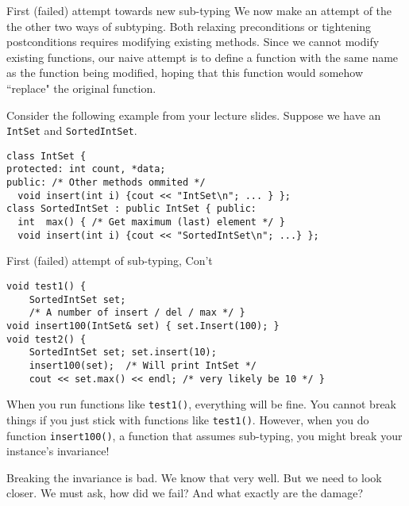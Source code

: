 \begin{frame}[fragile]{First (failed) attempt towards new sub-typing}
We now make an attempt of the the other two ways of subtyping. Both relaxing preconditions or tightening postconditions requires modifying existing methods. Since we cannot modify existing functions, our naive attempt is to define a function with the same name as the function being modified, hoping that this function would somehow ``replace" the original function. 

Consider the following example from your lecture slides. Suppose we have an \texttt{IntSet} and \texttt{SortedIntSet}.

\begin{verbatim}
class IntSet { 
protected: int count, *data; 
public: /* Other methods ommited */
  void insert(int i) {cout << "IntSet\n"; ... } };
class SortedIntSet : public IntSet { public: 
  int  max() { /* Get maximum (last) element */ }
  void insert(int i) {cout << "SortedIntSet\n"; ...} };
\end{verbatim}
\end{frame}

\begin{frame}[fragile]{First (failed) attempt of sub-typing, Con't}
\begin{verbatim}
void test1() { 
    SortedIntSet set; 
    /* A number of insert / del / max */ }
void insert100(IntSet& set) { set.Insert(100); }
void test2() { 
    SortedIntSet set; set.insert(10); 
    insert100(set);  /* Will print IntSet */
    cout << set.max() << endl; /* very likely be 10 */ }
\end{verbatim}

When you run functions like \texttt{test1()}, everything will be fine. You cannot break things if you just stick with functions like \texttt{test1()}. However, when you do function \texttt{insert100()}, a function that assumes sub-typing, you might break your instance's invariance!

Breaking the invariance is bad. We know that very well. But we need to look closer. We must ask, how did we fail? And what exactly are the damage?
\end{frame}

